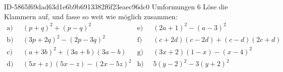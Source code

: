 \begin{exercise}
      {ID-5865f69dad63d1e6b9b6913382f6f23eaec96dc0}
      {Umformungen 6}
  \ifproblem\problem
    \newcommand{\gap}{\;\;}%
    Löse die Klammern auf, und fasse so weit wie möglich zusammen:
    \begin{align*}
      \text{a)}\gap & (p+q)^2+(p-q)^2 &
      \text{e)}\gap & (2a+1)^2-(a-3)^2
      \\
      \text{b)}\gap & (3p+2q)^2-(2p-3q)^2 &
      \text{f)}\gap & (c+2d)(c-2d)+(c-d)(2c+d)
      \\
      \text{c)}\gap & (a+3b)^2+(3a+b)(3a-b) &
      \text{g)}\gap & (3x+2)(1-x)-(x-4)^2
      \\
      \text{d)}\gap & (5x+z)(5x-z)-(2x-5z)^2 &
      \text{h)}\gap & 5(y-2)^2-3(y+2)^2
    \end{align*}
  \fi
\end{exercise}
